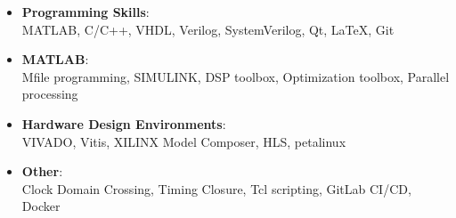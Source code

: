 
\begin{itemize}
	\item \textbf{Programming Skills}:
	\\ MATLAB, C/C++, VHDL, Verilog, SystemVerilog, Qt, \LaTeX,   Git
	\item \textbf{MATLAB}:
 	\\ \quad Mfile programming, SIMULINK, DSP toolbox, Optimization toolbox, Parallel processing 
	\item \textbf{Hardware Design Environments}:
 	\\ \quad VIVADO, Vitis, XILINX Model Composer, HLS, petalinux
	\item \textbf{Other}:
	\\ \quad Clock Domain Crossing, Timing Closure, Tcl scripting, GitLab CI/CD, Docker
\end{itemize}